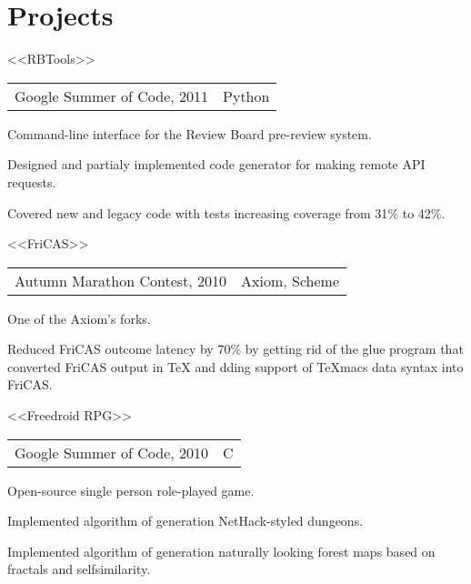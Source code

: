 \documentclass[a4paper]{article}
\begin{document}

	\section{Projects}
	\begin{multicols}{2}
		\raggedcolumns
		\begin{project}{<<RBTools>>}{\begin{tabular}{@{}l|l}Google Summer of Code, 2011 & Python\\\end{tabular}}
			Command-line interface for the Review Board pre-review system.
			\begin{items}
				\item Designed and partialy implemented code generator for making remote API requests.
				\item Covered new and legacy code with tests increasing coverage from 31$\%$ to 42$\%$.
			\end{items}
		\end{project}

		\begin{project}{<<FriCAS>>}{\begin{tabular}{@{}l|l}Autumn Marathon Contest, 2010 & Axiom, Scheme\\\end{tabular}}
			One of the Axiom's forks.
			\begin{items}
				\item Reduced FriCAS outcome latency by 70$\%$ by getting rid of the glue program that converted FriCAS output in \TeX{} and dding support of TeXmacs data syntax into FriCAS.
			\end{items}
		\end{project}

		\columnbreak

		\begin{project}{<<Freedroid RPG>>}{\begin{tabular}{@{}l|l}Google Summer of Code, 2010 & C\\\end{tabular}}
			Open-source single person role-played game.
			\begin{items}
				\item Implemented algorithm of generation NetHack-styled dungeons.
				\item Implemented algorithm of generation naturally looking forest maps based on fractals and selfsimilarity.
			\end{items}
		\end{project}


\end{multicols}
\end{document}
